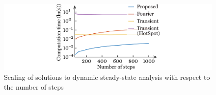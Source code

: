 \begin{figure}
  \centering
  \includegraphics[width=1.0\linewidth]{include/assets/figures/utopia-dynamic-steady-state-speed-steps.pdf}
  \caption{
    Scaling of solutions to dynamic steady-state analysis with respect to the
    number of steps
  }
\end{figure}
